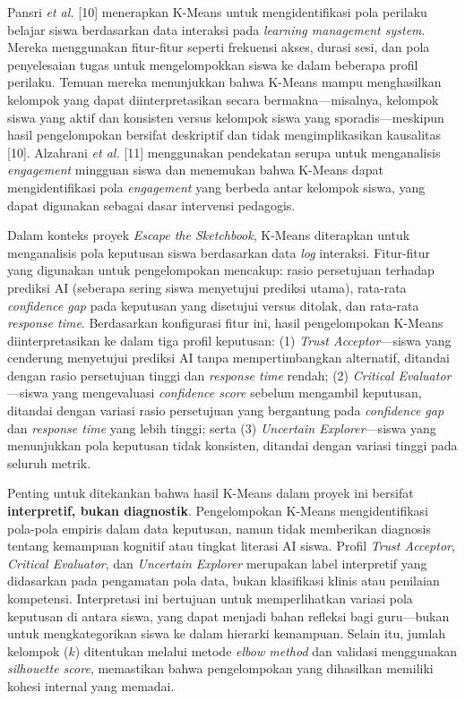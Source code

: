 Pansri \textit{et al.} [10] menerapkan K-Means untuk mengidentifikasi pola perilaku belajar siswa berdasarkan data interaksi pada \textit{learning management system}. Mereka menggunakan fitur-fitur seperti frekuensi akses, durasi sesi, dan pola penyelesaian tugas untuk mengelompokkan siswa ke dalam beberapa profil perilaku. Temuan mereka menunjukkan bahwa K-Means mampu menghasilkan kelompok yang dapat diinterpretasikan secara bermakna—misalnya, kelompok siswa yang aktif dan konsisten versus kelompok siswa yang sporadis—meskipun hasil pengelompokan bersifat deskriptif dan tidak mengimplikasikan kausalitas [10]. Alzahrani \textit{et al.} [11] menggunakan pendekatan serupa untuk menganalisis \textit{engagement} mingguan siswa dan menemukan bahwa K-Means dapat mengidentifikasi pola \textit{engagement} yang berbeda antar kelompok siswa, yang dapat digunakan sebagai dasar intervensi pedagogis.

Dalam konteks proyek \textit{Escape the Sketchbook}, K-Means diterapkan untuk menganalisis pola keputusan siswa berdasarkan data \textit{log} interaksi. Fitur-fitur yang digunakan untuk pengelompokan mencakup: rasio persetujuan terhadap prediksi AI (seberapa sering siswa menyetujui prediksi utama), rata-rata \textit{confidence gap} pada keputusan yang disetujui versus ditolak, dan rata-rata \textit{response time}. Berdasarkan konfigurasi fitur ini, hasil pengelompokan K-Means diinterpretasikan ke dalam tiga profil keputusan: (1) \textit{Trust Acceptor}—siswa yang cenderung menyetujui prediksi AI tanpa mempertimbangkan alternatif, ditandai dengan rasio persetujuan tinggi dan \textit{response time} rendah; (2) \textit{Critical Evaluator}—siswa yang mengevaluasi \textit{confidence score} sebelum mengambil keputusan, ditandai dengan variasi rasio persetujuan yang bergantung pada \textit{confidence gap} dan \textit{response time} yang lebih tinggi; serta (3) \textit{Uncertain Explorer}—siswa yang menunjukkan pola keputusan tidak konsisten, ditandai dengan variasi tinggi pada seluruh metrik.

Penting untuk ditekankan bahwa hasil K-Means dalam proyek ini bersifat \textbf{interpretif, bukan diagnostik}. Pengelompokan K-Means mengidentifikasi pola-pola empiris dalam data keputusan, namun tidak memberikan diagnosis tentang kemampuan kognitif atau tingkat literasi AI siswa. Profil \textit{Trust Acceptor}, \textit{Critical Evaluator}, dan \textit{Uncertain Explorer} merupakan label interpretif yang didasarkan pada pengamatan pola data, bukan klasifikasi klinis atau penilaian kompetensi. Interpretasi ini bertujuan untuk memperlihatkan variasi pola keputusan di antara siswa, yang dapat menjadi bahan refleksi bagi guru—bukan untuk mengkategorikan siswa ke dalam hierarki kemampuan. Selain itu, jumlah kelompok ($k$) ditentukan melalui metode \textit{elbow method} dan validasi menggunakan \textit{silhouette score}, memastikan bahwa pengelompokan yang dihasilkan memiliki kohesi internal yang memadai.

